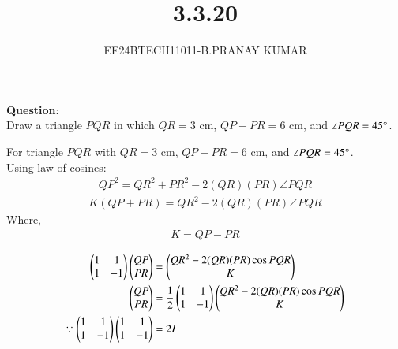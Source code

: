 \documentclass[journal]{IEEEtran}
\begin{document}

\vspace{3cm}

\title{3.3.20}
\author{EE24BTECH11011-B.PRANAY KUMAR
}
 \maketitle
{\let\newpage\relax\maketitle}

\renewcommand{\thefigure}{\theenumi}
\renewcommand{\thetable}{\theenumi}
\setlength{\intextsep}{10pt} %


\renewcommand{\thetable}{\theenumi}



\textbf{Question}:\\
Draw a triangle $PQR$ in which $QR = 3$ cm, $QP - PR = 6$ cm, and $\angle PQR = 45\degree$.\\

\solution

For triangle $PQR$ with $QR = 3$ cm, $QP - PR = 6$ cm, and $\angle PQR = 45\degree$.\\
Using law of cosines:
\begin{align}
    QP^2 = QR^2 + PR^2 - 2(QR) (PR) \angle PQR 
\end{align}
\begin{align}
    K (QP+PR) = QR^2 - 2 (QR) (PR) \angle PQR 
\end{align}
Where,
\begin{align}
    K = QP-PR
\end{align}

\begin{align}
    \begin{pmatrix}1 & 1 \\ 1 & -1\end{pmatrix} \begin{pmatrix}QP\\ PR\end{pmatrix} &= \begin{pmatrix}QR^2 - 2(QR)(PR) \cos PQR \\ K\end{pmatrix} \\
    \begin{pmatrix}QP \\ PR\end{pmatrix} &= \frac{1}{2} \begin{pmatrix}1 & 1 \\ 1 & -1\end{pmatrix} \begin{pmatrix}QR^2 - 2(QR)(PR) \cos PQR \\ K\end{pmatrix} \\
    \because \begin{pmatrix}1 & 1 \\ 1 & -1\end{pmatrix} \begin{pmatrix}1 & 1 \\ 1 & -1\end{pmatrix} &= 2I
\end{align}
\end{document}
